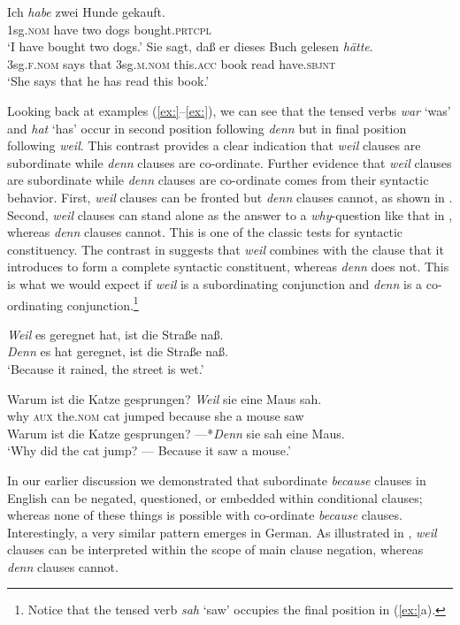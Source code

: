 \ea
\ea  \gll Ich  \textit{habe}  zwei  Hunde  gekauft.\\
1sg.\textsc{nom}  have  two  dogs  bought.\textsc{prtcpl}\\
\glt ‘I have bought two dogs.’
\ex \gll Sie  sagt,  daß  er  dieses  Buch  gelesen  \textit{hätte}.\\
3sg.\textsc{f}.\textsc{nom}  says  that  3sg.\textsc{m}.\textsc{nom}  this.\textsc{acc}  book  read  have.\textsc{sbjnt}\\
\glt ‘She says that he has read this book.’
\z \z


Looking back at examples (\ref{ex:}--\ref{ex:}), we can see that the tensed verbs \textit{war} ‘was’ and \textit{hat} ‘has’ occur in second position following \textit{denn} but in final position following \textit{weil}. This contrast provides a clear indication that \textit{weil} clauses are subordinate while \textit{denn} clauses are co-ordinate. Further evidence that \textit{weil} clauses are subordinate while \textit{denn} clauses are co-ordinate comes from their syntactic behavior. First, \textit{weil} clauses can be fronted but \textit{denn} clauses cannot, as shown in . Second, \textit{weil} clauses can stand alone as the answer to a \textit{why}-question like that in , whereas \textit{denn} clauses cannot. This is one of the classic tests for syntactic constituency. The contrast in  suggests that \textit{weil} combines with the clause that it introduces to form a complete syntactic constituent, whereas \textit{denn} does not. This is what we would expect if \textit{weil} is a subordinating conjunction and \textit{denn} is a co-ordinating conjunction.\footnote{Notice that the tensed verb \textit{sah} ‘saw’ occupies the final position in (\ref{ex:}a).}


\ea
\ea \textit{Weil} es geregnet hat, ist die Straße naß.\\
\ex *\textit{Denn} es hat geregnet, ist die Straße naß.\\
\glt ‘Because it rained, the street is wet.’
\z \z

\ea
\ea \gll Warum  ist  die  Katze  gesprungen?  \textit{Weil}  sie  eine  Maus  sah.\\
why  \textsc{aux}  the.\textsc{nom}  cat  jumped  because  she  a  mouse  saw\\
\ex  Warum ist die Katze gesprungen? —*\textit{Denn} sie sah eine Maus.\\
\glt ‘Why did the cat jump? — Because it saw a mouse.’
\z \z


In our earlier discussion we demonstrated that subordinate \textit{because} clauses in English can be negated, questioned, or embedded within conditional clauses; whereas none of these things is possible with co-ordinate \textit{because} clauses. Interestingly, a very similar pattern emerges in German. As illustrated in , \textit{weil} clauses can be interpreted within the scope of main clause negation, whereas \textit{denn} clauses cannot.


